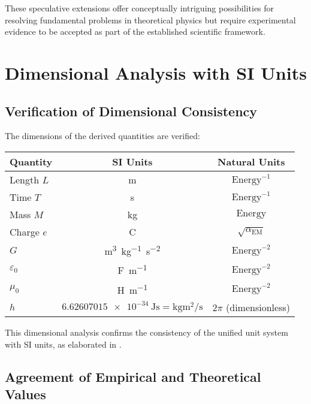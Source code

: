 \documentclass[12pt,a4paper]{article}
\newcommand{\alphaEM}{\alpha_{\text{EM}}}
\begin{document}
	These speculative extensions offer conceptually intriguing possibilities for resolving fundamental problems in theoretical physics but require experimental evidence to be accepted as part of the established scientific framework.
	
	\section{Dimensional Analysis with SI Units}
	\label{sec:dimensional_analysis}
	
	\subsection{Verification of Dimensional Consistency}
	\label{subsec:dimensional_consistency}
	
	The dimensions of the derived quantities are verified:
	
	\begin{center}
		\begin{tabular}{lcc}
			\toprule
			\textbf{Quantity} & \textbf{SI Units} & \textbf{Natural Units} \\
			\midrule
			Length \(L\) & \si{\meter} & \(\text{Energy}^{-1}\) \\
			Time \(T\) & \si{\second} & \(\text{Energy}^{-1}\) \\
			Mass \(M\) & \si{\kilo\gram} & \(\text{Energy}\) \\
			Charge \(e\) & \si{\coulomb} & \(\sqrt{\alphaEM}\) \\
			\(G\) & \si{\meter^3\kilo\gram^{-1}\second^{-2}} & \(\text{Energy}^{-2}\) \\
			\(\varepsilon_0\) & \si{\farad\per\meter} & \(\text{Energy}^{-2}\) \\
			\(\mu_0\) & \si{\henry\per\meter} & \(\text{Energy}^{-2}\) \\
			\(h\) & \(\SI{6.62607015e-34}{\joule\second} = \si{\kilo\gram \meter\squared\per\second}\) & \(2\pi\) (dimensionless) \\
			\bottomrule
		\end{tabular}
	\end{center}
	
	This dimensional analysis confirms the consistency of the unified unit system with SI units, as elaborated in \cite{pascher_alphabeta_2025}.
	
	\subsection{Agreement of Empirical and Theoretical Values}
	\label{subsec:empirical_theoretical}
	
\end{document}
